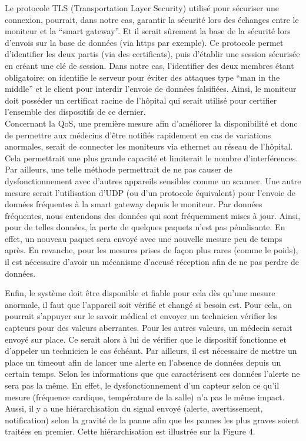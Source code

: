 \documentclass{article}
\begin{document}
Le protocole TLS (Transportation Layer Security) utilisé pour sécuriser une connexion, pourrait, dans notre cas, garantir la sécurité lors des échanges entre le moniteur et la “smart gateway”.  Et il serait sûrement la base de la sécurité lors d’envois sur la base de données (via https par exemple). Ce protocole permet d’identifier les deux partis (via des certificats), puis d’établir une session sécurisée en créant une clé de session. Dans notre cas, l’identifier des deux membres étant obligatoire: on identifie le serveur pour éviter des attaques type “man in the middle” et le client pour interdir l’envoie de données falsifiées. Ainsi, le moniteur doit posséder un certificat racine de l’hôpital qui serait utilisé pour certifier l’ensemble des dispositifs de ce dernier.
\\

Concernant la QoS, une première mesure afin d’améliorer la disponibilité et donc de permettre aux médecins d’être notifiés rapidement en cas de variations anormales, serait de connecter les moniteurs via ethernet au réseau de l’hôpital. Cela permettrait une plus grande capacité et limiterait le nombre d’interférences. Par ailleurs, une telle méthode permettrait de ne pas causer de dysfonctionnement avec d’autres appareils sensibles comme un scanner. Une autre mesure serait l’utilisation d’UDP (ou d’un protocole équivalent) pour l’envoie de données fréquentes à la smart gateway depuis le moniteur. Par données fréquentes, nous entendons des données qui sont fréquemment mises à jour. Ainsi, pour de telles données, la perte de quelques paquets n’est pas pénalisante. En effet, un nouveau paquet sera envoyé avec une nouvelle mesure peu de temps après. En revanche, pour les mesures prises de façon plus rares (comme le poids), il est nécessaire d’avoir un mécanisme d’accusé réception afin de ne pas perdre de données.

Enfin, le système doit être disponible et fiable pour cela dès qu’une mesure anormale, il faut que l’appareil soit vérifié et changé si besoin est. Pour cela, on pourrait s’appuyer sur le savoir médical et envoyer un technicien vérifier les capteurs pour des valeurs aberrantes. Pour les autres valeurs, un médecin serait envoyé sur place. Ce serait alors à lui de vérifier que le dispositif fonctionne et d’appeler un technicien le cas échéant. Par ailleurs, il est nécessaire de mettre un place un timeout afin de lancer une alerte en l’absence de données depuis un certain temps. Selon les informations que que caractérisent ces données l’alerte ne sera pas la même. En effet, le dysfonctionnement d’un capteur selon ce qu’il mesure (fréquence cardique, température de la salle) n’a pas le même impact. Aussi, il y a une hiérarchisation du signal envoyé (alerte, avertissement, notification) selon la gravité de la panne afin que les pannes les plus graves soient traitées en premier. Cette hiérarchisation est illustrée sur la Figure 4.
\end{document}
